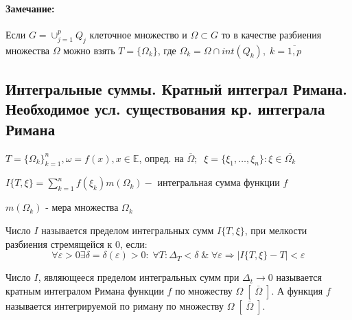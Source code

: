 \paragraph{Замечание:}\vspace{-10pt}
	Если $G=\cup^p_{j=1} Q_j $ клеточное множество и $\Omega \subset G $  то в качестве разбиения множества $\Omega $ можно взять $T=\{\Omega_k \} $, где $\Omega_k = \Omega\cap int(Q_k), \; k=\overline{1,p} $

\subsection{Интегральные суммы. Кратный интеграл Римана. \\Необходимое усл. существования кр. интеграла Римана}
$T=\{\Omega_k \}_{k=1}^n,  \omega=f(x), x\in \mathbb{E}$, опред. на $\overline{\Omega}; \;\;\xi = \{\xi_1, \dots, \xi_n \}: \xi \in \overline{\Omega_k} $

\begin{determenition}\vspace{-10pt}
	$I\{T, \xi\} = \sum\limits_{k=1}^n f(\xi_k)m(\Omega_k) - $ интегральная сумма функции $f$
\end{determenition}

\begin{determenition}\vspace{-10pt}
	$m(\Omega_k)$ - мера множества $ \Omega_k$
\end{determenition}


\begin{determenition}\vspace{-10pt}
	Число $I$ называется пределом интегральных сумм $I\{T,\xi \} $, при мелкости разбиения стремящейся к 0, если:\vspace{-10pt}
$$\forall \varepsilon>0 \exists \delta=\delta(\varepsilon)>0: \; \forall T: \Delta_T< \delta\;\&\; \forall \varepsilon \Rightarrow  |I\{T,\xi \} - T|< \varepsilon$$
\end{determenition}

\begin{determenition}\vspace{-10pt}
	Число $I $, являющееся пределом интегральных сумм при $\Delta_t\rightarrow 0$ называется кратным интегралом Римана функции $f$ по множеству $\Omega \; [\;\overline{\Omega}\;]$. А функция $f$ называется интегрируемой по риману по множеству $\Omega \; [\;\overline{\Omega}\;].$
\end{determenition}\vspace{-20pt}
\vspace{-10pt}
